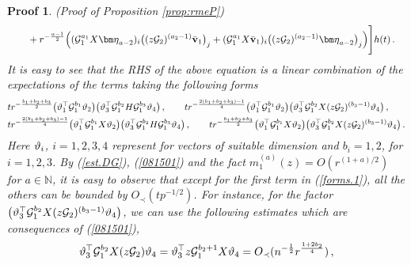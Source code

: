 \documentclass[12pt]{article}
\numberwithin{equation}{section}
\newtheorem{myPro}{Proof}
\theoremstyle{remark}
\newcommand{\1}{{\rm 1}\kern-0.24em{\rm I}}
\begin{document}
\begin{appendices}
\begin{myPro}{(Proof of Proposition  \ref{prop:rmeP})}
{\begin{align}
    & \qquad+   r^{-\frac{a-1}{2}}  \Big((\mathcal{G}_1^{a_1}{X}{\bm \eta}_{a-2})_{i} \big( (z\mathcal{G}_2)^{(a_2-1)}\bar{\bf v}_1\big)_j + (\mathcal{G}_1^{a_1}{X}\bar{\bf v}_1)_{i} \big( (z\mathcal{G}_2)^{(a_2-1)}{\bm \eta}_{a-2}\big)_j\Big)\Bigg]h(t)\,. 
 \end{align}
 }
 It is easy to see that the RHS of the above equation is a linear combination of the expectations of the terms taking the following forms 
 \begin{align}\label{forms.1}
 &tr^{-\frac{b_1+b_2+b_3}{2}}\big({\bf {\vartheta}}_1^{\top} \mathcal{G}_1^{b_1} {\bf {\vartheta}}_2 \big) \big({\bf {\vartheta}}_3^{\top} \mathcal{G}_1^{b_2}{H}\mathcal{G}_1^{b_3} {\bf {\vartheta}}_4 \big)\,,\qquad 
 tr^{-\frac{2(b_1+b_2+b_3)-1}{4}} \big({\bf {\vartheta}}_1^{\top} \mathcal{G}_1^{b_1} {\bf {\vartheta}}_2 \big) \big({\bf {\vartheta}}_3^{\top} \mathcal{G}_1^{b_2}{X} (z\mathcal{G}_2)^{(b_3-1)} {\bf {\vartheta}}_4 \big)\,,\notag\\
  &
  tr^{-\frac{2(b_1+b_2+b_3)-1}{4}}  \big({\bf {\vartheta}}_1^{\top} \mathcal{G}_1^{b_1}{X} {\bf {\vartheta}}_2 \big) \big({\bf {\vartheta}}_3^{\top} \mathcal{G}_1^{b_2}{H}\mathcal{G}_1^{b_3} {\bf {\vartheta}}_4 \big)\,,
   \qquad  tr^{-\frac{b_1+b_2+b_3}{2}}\big({\bf {\vartheta}}_1^{\top} \mathcal{G}_1^{b_1} {X}{\bf {\vartheta}}_2 \big) \big({\bf {\vartheta}}_3^{\top} \mathcal{G}_1^{b_2}{X} (z\mathcal{G}_2)^{(b_3-1)} {\bf {\vartheta}}_4 \big)\,. 
 \end{align}
 Here ${\bf {\vartheta}}_{i}$, $ i=1,2,3,4$ represent for vectors of suitable dimension and $b_i=1,2$, for $i=1,2,3$.
 By  (\ref{est.DG}), (\ref{081501}) and the fact $m_1^{(a)}(z)= O(r^{(1+a)/2})$ for $a\in \mathbb{N}$, it is easy to observe that except for the first term  in (\ref{forms.1}), all the others can be bounded by $O_\prec(tp^{-1/2})$. For instance, for the factor  $\big({\bf {\vartheta}}_3^{\top} \mathcal{G}_1^{b_2}{X} (z\mathcal{G}_2)^{(b_3-1)} {\bf {\vartheta}}_4 \big)$, we can use the following estimates which are consequences of (\ref{081501}),
 \begin{align*}
&{\bf {\vartheta}}_3^{\top} \mathcal{G}_1^{b_2}{X} (z\mathcal{G}_2) {\bf {\vartheta}}_4  = {\bf {\vartheta}}_3^{\top} z\mathcal{G}_1^{b_2+1} {X} {\bf {\vartheta}}_4 = O_\prec(n^{-\frac 12}  r^{\frac{1+2b_2}{4}})\,,\notag\\

\end{align*}
\end{myPro}
\end{appendices}
\end{document}
